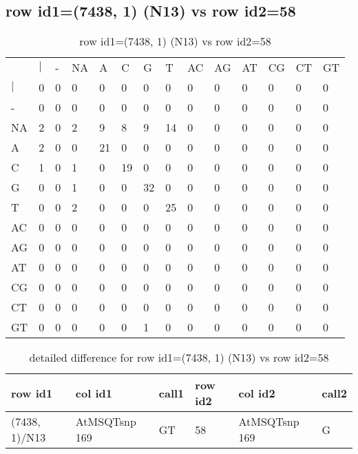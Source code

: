 \subsection{row id1=(7438, 1) (N13) vs row id2=58}
\begin{center}
\begin{longtable}{|l|l|l|l|l|l|l|l|l|l|l|l|l|l|}
\caption{row id1=(7438, 1) (N13) vs row id2=58} \label{table_dm310}\\
\hline
\\
\hline
&$|$&-&NA&A&C&G&T&AC&AG&AT&CG&CT&GT\\
$|$&0&0&0&0&0&0&0&0&0&0&0&0&0\\
-&0&0&0&0&0&0&0&0&0&0&0&0&0\\
NA&2&0&2&9&8&9&14&0&0&0&0&0&0\\
A&2&0&0&21&0&0&0&0&0&0&0&0&0\\
C&1&0&1&0&19&0&0&0&0&0&0&0&0\\
G&0&0&1&0&0&32&0&0&0&0&0&0&0\\
T&0&0&2&0&0&0&25&0&0&0&0&0&0\\
AC&0&0&0&0&0&0&0&0&0&0&0&0&0\\
AG&0&0&0&0&0&0&0&0&0&0&0&0&0\\
AT&0&0&0&0&0&0&0&0&0&0&0&0&0\\
CG&0&0&0&0&0&0&0&0&0&0&0&0&0\\
CT&0&0&0&0&0&0&0&0&0&0&0&0&0\\
GT&0&0&0&0&0&1&0&0&0&0&0&0&0\\
\hline
\end{longtable}
\end{center}

\begin{center}
\begin{longtable}{|l|l|l|l|l|l|}
\caption{detailed difference for row id1=(7438, 1) (N13) vs row id2=58} \label{table_dm311}\\
\hline
row id1&col id1&call1&row id2&col id2&call2\\
\hline
(7438, 1)/N13&AtMSQTsnp 169&GT&58&AtMSQTsnp 169&G\\
\hline
\end{longtable}
\end{center}


